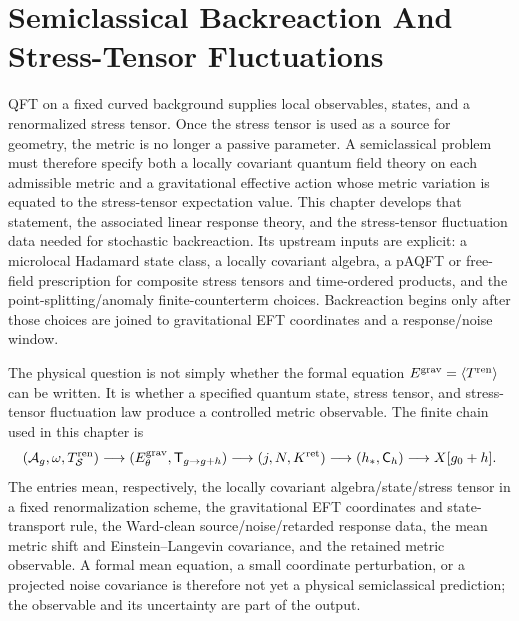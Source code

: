\chapter{Semiclassical Backreaction And Stress-Tensor Fluctuations}
\label{ch:curved-semiclassical-backreaction}

\ConventionsLorentzian

QFT on a fixed curved background supplies local observables, states, and a
renormalized stress tensor.  Once the stress tensor is used as a source for
geometry, the metric is no longer a passive parameter.  A semiclassical
problem must therefore specify both a locally covariant quantum field theory
on each admissible metric and a gravitational effective action whose metric
variation is equated to the stress-tensor expectation value.  This chapter
develops that statement, the associated linear response theory, and the
stress-tensor fluctuation data needed for stochastic backreaction.
Its upstream inputs are explicit: a microlocal Hadamard state class, a
locally covariant algebra, a pAQFT or free-field prescription for composite
stress tensors and time-ordered products, and the point-splitting/anomaly
finite-counterterm choices.  Backreaction begins only after those choices are
joined to gravitational EFT coordinates and a response/noise window.

The physical question is not simply whether the formal equation
\(E^{\rm grav}=\langle T^{\rm ren}\rangle\) can be written.  It is whether a
specified quantum state, stress tensor, and stress-tensor fluctuation law
produce a controlled metric observable.  The finite chain used in this chapter
is
\begin{equation}
  (\mathcal A_g,\omega,T_{\mathcal S}^{\rm ren})
  \longrightarrow
  (E_\theta^{\rm grav},\mathsf T_{g\to g+h})
  \longrightarrow
  (j,N,K^{\rm ret})
  \longrightarrow
  (h_*,\mathsf C_h)
  \longrightarrow
  X[g_0+h].
  \label{eq:semiclassical-observable-chain}
\end{equation}
The entries mean, respectively, the locally covariant algebra/state/stress
tensor in a fixed renormalization scheme, the gravitational EFT coordinates
and state-transport rule, the Ward-clean source/noise/retarded response data,
the mean metric shift and Einstein--Langevin covariance, and the retained
metric observable.  A formal mean equation, a small coordinate perturbation, or
a projected noise covariance is therefore not yet a physical semiclassical
prediction; the observable and its uncertainty are part of the output.

